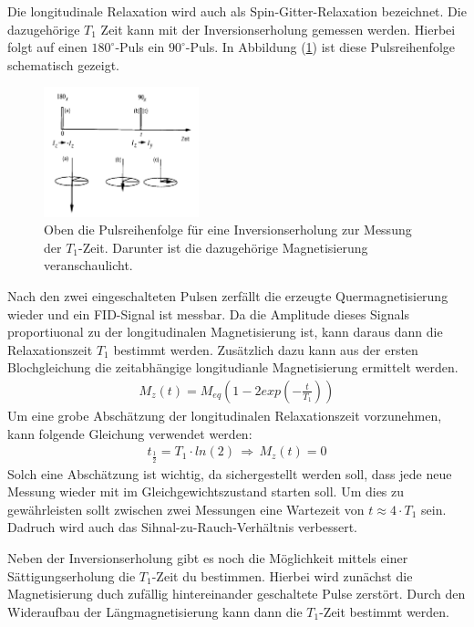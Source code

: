 Die longitudinale Relaxation wird auch als Spin-Gitter-Relaxa{\-}tion bezeichnet.
Die dazugeh\"{o}rige $T_1$ Zeit kann mit der Inversionserholung gemessen werden.
Hierbei folgt auf einen $180^{\circ}$-Puls ein $90^{\circ}$-Puls.
In Abbildung (\ref{inversion}) ist diese Pulsreihenfolge schematisch gezeigt.
\begin{figure}
	\centering
	\includegraphics[width=0.4\textwidth]{Plots/inversionserholung.png}
	\caption{Oben die Pulsreihenfolge f\"{u}r eine Inversionserholung zur Messung der $T_1$-Zeit. Darunter ist die dazugeh\"{o}rige Magnetisierung veranschaulicht.}
	\label{inversion}
\end{figure}
Nach den zwei eingeschalteten Pulsen zerf\"{a}llt die erzeugte Quer{\-}mag{\-}ne{\-}ti{\-}sie{\-}rung wieder und ein FID-Signal ist messbar.
Da die Amplitude dieses Signals proportiuonal zu der longitudinalen Magnetisierung ist, kann daraus dann die Relaxationszeit $T_1$ bestimmt werden.
Zus\"{a}tzlich dazu kann aus der ersten Blochgleichung die zeitabh\"{a}ngige longitudianle Magnetisierung ermittelt werden.
\begin{align*}
	M_z(t) = M_{eq} \left(1 - 2 exp\left( - \frac{t}{T_1} \right) \right)
\end{align*}
Um eine grobe Absch\"{a}tzung der longitudinalen Relaxationszeit vorzunehmen, kann folgende Gleichung verwendet werden:
\begin{align*}
	t_{\frac{1}{2}} = T_1 \cdot ln(2) \, \Rightarrow \, M_z(t) = 0
\end{align*}
Solch eine Absch\"{a}tzung ist wichtig, da sichergestellt werden soll, dass jede neue Messung wieder mit im Gleichgewichtszustand starten soll.
Um dies zu gew\"{a}hrleisten sollt zwischen zwei Messungen eine Wartezeit von $t \approx 4 \cdot T_1$ sein.
Dadruch wird auch das Sihnal-zu-Rauch-Verh\"{a}ltnis verbessert.

Neben der Inversionserholung gibt es noch die M\"{o}glichkeit mittels einer S\"{a}ttigungserholung die $T_1$-Zeit du bestimmen.
Hierbei wird zun\"{a}chst die Magnetisierung duch zuf\"{a}llig hintereinander geschaltete Pulse zerst\"{o}rt.
Durch den Wideraufbau der L\"{a}ngmagnetisierung kann dann die $T_1$-Zeit bestimmt werden.

